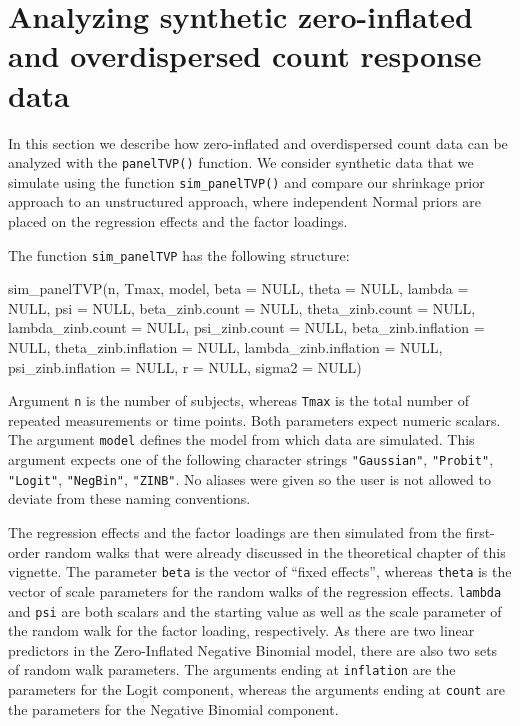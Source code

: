 \documentclass[a4paper, preprint, 3p,
authoryear]{elsarticle} %
\newenvironment{Shaded}{\begin{snugshade}}{\end{snugshade}}
\newcommand{\NormalTok}[1]{#1}
\begin{document}
\section{Analyzing synthetic zero-inflated and overdispersed count
response
data}\label{analyzing-synthetic-zero-inflated-and-overdispersed-count-response-data}

In this section we describe how zero-inflated and overdispersed count
data can be analyzed with the \texttt{panelTVP()} function. We consider
synthetic data that we simulate using the function
\texttt{sim\_panelTVP()} and compare our shrinkage prior approach to an
unstructured approach, where independent Normal priors are placed on the
regression effects and the factor loadings.

The function \texttt{sim\_panelTVP} has the following structure:

\begin{Shaded}
\begin{Highlighting}[]
\NormalTok{sim\_panelTVP(n, Tmax, model,}
\NormalTok{             beta = NULL, theta = NULL,}
\NormalTok{             lambda = NULL, psi = NULL,}
\NormalTok{             beta\_zinb.count = NULL, theta\_zinb.count = NULL,}
\NormalTok{             lambda\_zinb.count = NULL, psi\_zinb.count = NULL,}
\NormalTok{             beta\_zinb.inflation = NULL, theta\_zinb.inflation = NULL,}
\NormalTok{             lambda\_zinb.inflation = NULL, psi\_zinb.inflation = NULL, }
\NormalTok{             r = NULL, sigma2 = NULL)}
\end{Highlighting}
\end{Shaded}

Argument \texttt{n} is the number of subjects, whereas \texttt{Tmax} is
the total number of repeated measurements or time points. Both
parameters expect numeric scalars. The argument \texttt{model} defines
the model from which data are simulated. This argument expects one of
the following character strings \texttt{"Gaussian"}, \texttt{"Probit"},
\texttt{"Logit"}, \texttt{"NegBin"}, \texttt{"ZINB"}. No aliases were
given so the user is not allowed to deviate from these naming
conventions.

The regression effects and the factor loadings are then simulated from
the first-order random walks that were already discussed in the
theoretical chapter of this vignette. The parameter \texttt{beta} is the
vector of ``fixed effects'', whereas \texttt{theta} is the vector of
scale parameters for the random walks of the regression effects.
\texttt{lambda} and \texttt{psi} are both scalars and the starting value
as well as the scale parameter of the random walk for the factor
loading, respectively. As there are two linear predictors in the
Zero-Inflated Negative Binomial model, there are also two sets of random
walk parameters. The arguments ending at \texttt{inflation} are the
parameters for the Logit component, whereas the arguments ending at
\texttt{count} are the parameters for the Negative Binomial component.
\end{document}
